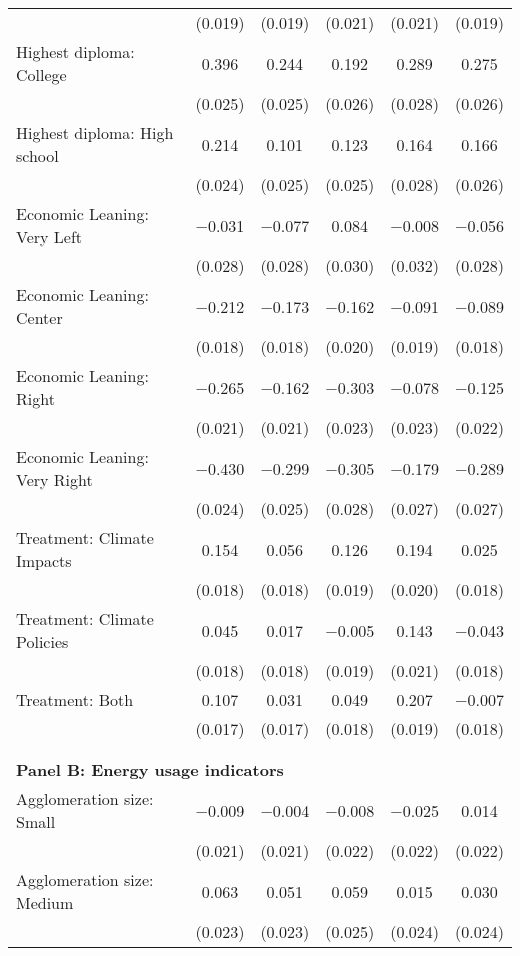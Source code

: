 \begin{tabular}{@{\extracolsep{5pt}}lccccc}
  & (0.019) & (0.019) & (0.021) & (0.021) & (0.019) \\ 
  Highest diploma: College & 0.396 & 0.244 & 0.192 & 0.289 & 0.275 \\ 
  & (0.025) & (0.025) & (0.026) & (0.028) & (0.026) \\ 
  Highest diploma: High school & 0.214 & 0.101 & 0.123 & 0.164 & 0.166 \\ 
  & (0.024) & (0.025) & (0.025) & (0.028) & (0.026) \\ 
  Economic Leaning: Very Left & $-$0.031 & $-$0.077 & 0.084 & $-$0.008 & $-$0.056 \\ 
  & (0.028) & (0.028) & (0.030) & (0.032) & (0.028) \\ 
  Economic Leaning: Center & $-$0.212 & $-$0.173 & $-$0.162 & $-$0.091 & $-$0.089 \\ 
  & (0.018) & (0.018) & (0.020) & (0.019) & (0.018) \\ 
  Economic Leaning: Right & $-$0.265 & $-$0.162 & $-$0.303 & $-$0.078 & $-$0.125 \\ 
  & (0.021) & (0.021) & (0.023) & (0.023) & (0.022) \\ 
  Economic Leaning: Very Right & $-$0.430 & $-$0.299 & $-$0.305 & $-$0.179 & $-$0.289 \\ 
  & (0.024) & (0.025) & (0.028) & (0.027) & (0.027) \\ 
  Treatment: Climate Impacts & 0.154 & 0.056 & 0.126 & 0.194 & 0.025 \\ 
  & (0.018) & (0.018) & (0.019) & (0.020) & (0.018) \\ 
  Treatment: Climate Policies & 0.045 & 0.017 & $-$0.005 & 0.143 & $-$0.043 \\ 
  & (0.018) & (0.018) & (0.019) & (0.021) & (0.018) \\ 
  Treatment: Both & 0.107 & 0.031 & 0.049 & 0.207 & $-$0.007 \\ 
  & (0.017) & (0.017) & (0.018) & (0.019) & (0.018) \\ 
 \\[1ex] \hline \\[1ex]
\multicolumn{ 6 }{l}{\textbf{ Panel B: Energy usage indicators }} \\
  Agglomeration size: Small & $-$0.009 & $-$0.004 & $-$0.008 & $-$0.025 & 0.014 \\ 
  & (0.021) & (0.021) & (0.022) & (0.022) & (0.022) \\ 
  Agglomeration size: Medium & 0.063 & 0.051 & 0.059 & 0.015 & 0.030 \\ 
  & (0.023) & (0.023) & (0.025) & (0.024) & (0.024) \\ 

\end{tabular}
